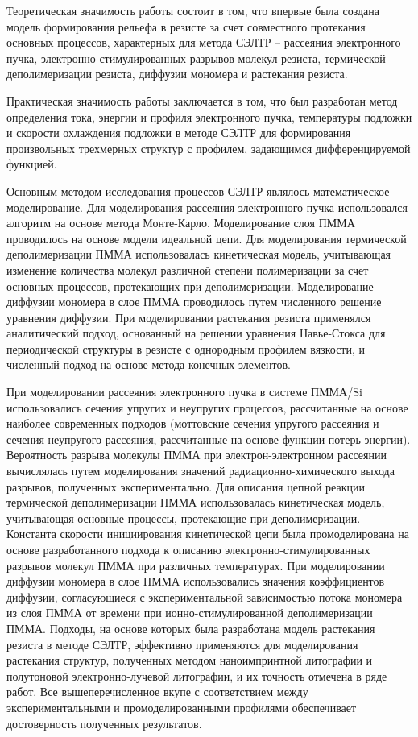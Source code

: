 \influence
Теоретическая значимость работы состоит в том, что впервые была создана модель формирования рельефа в резисте за счет совместного протекания основных процессов, характерных для метода СЭЛТР -- рассеяния электронного пучка, электронно-стимулированных разрывов молекул резиста, термической деполимеризации резиста, диффузии мономера и растекания резиста.


Практическая значимость работы заключается в том, что был разработан метод определения тока, энергии и профиля электронного пучка, температуры подложки и скорости охлаждения подложки в методе СЭЛТР для формирования произвольных трехмерных структур с профилем, задающимся дифференцируемой функцией.


\methods
Основным методом исследования процессов СЭЛТР являлось математическое моделирование. Для моделирования рассеяния электронного пучка использовался алгоритм на основе метода Монте-Карло. Моделирование слоя ПММА проводилось на основе модели идеальной цепи. Для моделирования термической деполимеризации ПММА использовалась кинетическая модель, учитывающая изменение количества молекул различной степени полимеризации за счет основных процессов, протекающих при деполимеризации. Моделирование диффузии мономера в слое ПММА проводилось путем численного решение уравнения диффузии. При моделировании растекания резиста применялся аналитический подход, основанный на решении уравнения Навье-Стокса для периодической структуры в резисте с однородным профилем вязкости, и численный подход на основе метода конечных элементов.


\probation
При моделировании рассеяния электронного пучка в системе ПММА/Si использовались сечения упругих и неупругих процессов, рассчитанные на основе наиболее современных подходов (моттовские сечения упругого рассеяния и сечения неупругого рассеяния, рассчитанные на основе функции потерь энергии). Вероятность разрыва молекулы ПММА при электрон-электронном рассеянии вычислялась путем моделирования значений радиационно-химического выхода разрывов, полученных экспериментально. Для описания цепной реакции термической деполимеризации ПММА использовалась кинетическая модель, учитывающая основные процессы, протекающие при деполимеризации. Константа скорости инициирования кинетической цепи была промоделирована на основе разработанного подхода к описанию электронно-стимулированных разрывов молекул ПММА при различных температурах. При моделировании диффузии мономера в слое ПММА использовались значения коэффициентов диффузии, согласующиеся с экспериментальной зависимостью потока мономера из слоя ПММА от времени при ионно-стимулированной деполимеризации ПММА. Подходы, на основе которых была разработана модель растекания резиста в методе СЭЛТР, эффективно применяются для моделирования растекания структур, полученных методом наноимпринтной литографии и полутоновой электронно-лучевой литографии, и их точность отмечена в ряде работ. Все вышеперечисленное вкупе с соответствием между экспериментальными и промоделированными профилями обеспечивает достоверность полученных результатов.

